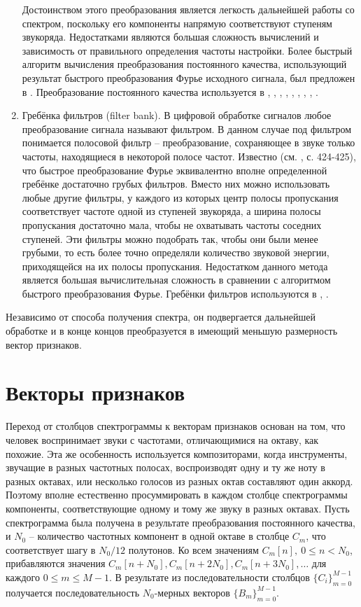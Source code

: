 \begin{enumerate}
  Достоинством этого преобразования является легкость дальнейшей работы со
  спектром, поскольку его компоненты напрямую соответствуют ступеням звукоряда.
  Недостатками являются большая сложность вычислений и зависимость от
  правильного определения частоты настройки. Более быстрый алгоритм вычисления
  преобразования постоянного качества, использующий результат быстрого
  преобразования Фурье исходного сигнала, был предложен в \cite{Brown1992}.
  Преобразование постоянного качества используется в \cite{Bello2005},
  \cite{Lee2006}, \cite{Mauch2008}, \cite{Mauch2009}, \cite{Oudre2009},
  \cite{Reed2009}, \cite{Cho2010}, \cite{Cho2011}, \cite{Ni2011}.
  
  \item Гребёнка фильтров (filter bank). В цифровой обработке сигналов любое
  преобразование сигнала называют фильтром. В данном случае под фильтром
  понимается полосовой фильтр -- преобразование, сохраняющее в звуке только
  частоты, находящиеся в некоторой полосе частот. Известно (см.
  \cite{Rabiner1978}, с. 424-425), что быстрое преобразование Фурье эквивалентно
  вполне определенной гребёнке достаточно грубых фильтров. Вместо них можно
  использовать любые другие фильтры, у каждого из которых центр полосы
  пропускания соответствует частоте одной из ступеней звукоряда, а ширина полосы
  пропускания достаточно мала, чтобы не охватывать частоты соседних ступеней.
  Эти фильтры можно подобрать так, чтобы они были менее грубыми, то есть более
  точно определяли количество звуковой энергии, приходящейся на их полосы
  пропускания. Недостатком данного метода является большая вычислительная
  сложность в сравнении с алгоритмом быстрого преобразования Фурье. Гребёнки
  фильтров используются в \cite{Jiang2011}, \cite{Humphrey2012}.
\end{enumerate}

Независимо от способа получения спектра, он подвергается дальнейшей обработке и
в конце концов преобразуется в имеющий меньшую размерность вектор признаков.

\section{Векторы признаков} \label{sectL_feat}

Переход от столбцов спектрограммы к векторам признаков основан на том, что
человек воспринимает звуки с частотами, отличающимися на октаву, как похожие.
Эта же особенность используется композиторами, когда инструменты, звучащие в
разных частотных полосах, воспроизводят одну и ту же ноту в разных октавах, или
несколько голосов из разных октав составляют один аккорд. Поэтому вполне
естественно просуммировать в каждом столбце спектрограммы компоненты,
соответствующие одному и тому же звуку в разных октавах. Пусть спектрограмма
была получена в результате преобразования постоянного качества, и $N_0$ --
количество частотных компонент в одной октаве в столбце $C_m$, что
соответствует шагу в $N_0/12$ полутонов. Ко всем значениям $C_m[n], ~ 0 \leq n <
N_0$, прибавляются значения $C_m[n+N_0], C_m[n+2N_0], C_m[n+3N_0], \ldots$ для
каждого $0 \leq m \leq M-1$. В результате из последовательности столбцов
$\{C_i\}_{m=0}^{M-1}$ получается последовательность $N_0$-мерных векторов
$\{B_m\}_{m=0}^{M-1}$.

